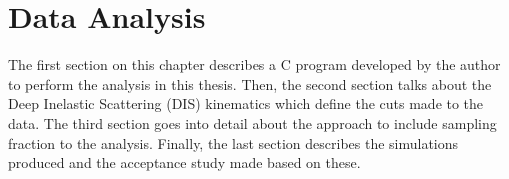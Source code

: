 \section{Data Analysis}
\label{sec::dataanalysis}
    The first section on this chapter describes a C program developed by the author to perform the analysis in this thesis.
    Then, the second section talks about the Deep Inelastic Scattering (DIS) kinematics which define the cuts made to the data.
    The third section goes into detail about the approach to include sampling fraction to the analysis.
    Finally, the last section describes the simulations produced and the acceptance study made based on these.

    
    
    
    
